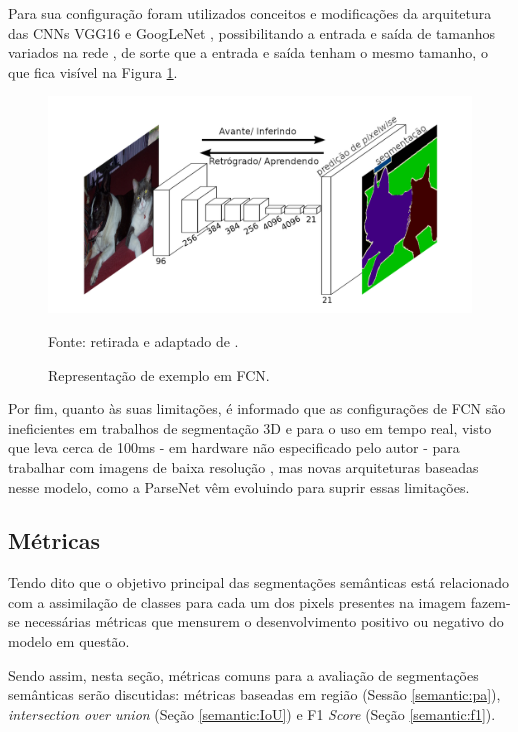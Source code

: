 Para sua configuração foram utilizados conceitos e modificações da arquitetura das CNNs VGG16 \cite{Simonyan2015} e GoogLeNet \cite{Szegedy2015}, possibilitando a entrada e saída de tamanhos variados na rede \cite{Minaee2021}, de sorte que a entrada e saída tenham o mesmo tamanho, o que fica visível na Figura \ref{semantic:fig:6}.

\begin{figure}[H]
    \centering
    \caption{Representação de exemplo em FCN.}
    \includegraphics[width=1\linewidth]{recursos/imagens/semantic/fcn_example.png}
    \label{semantic:fig:6}

    Fonte: retirada e adaptado de \cite{Shelhamer2016}.
\end{figure}

Por fim, quanto às suas limitações, é informado que as configurações de FCN são ineficientes em trabalhos de segmentação 3D e para o uso em tempo real, visto que leva cerca de 100ms - em hardware não especificado pelo autor - para trabalhar com imagens de baixa resolução \cite{Minaee2021}, mas novas arquiteturas baseadas nesse modelo, como a ParseNet \cite{Liu2015} vêm evoluindo para suprir essas limitações.


\subsection{Métricas}
\label{semantic:metrics}
Tendo dito que o objetivo principal das segmentações semânticas está relacionado com a assimilação de classes para cada um dos pixels presentes na imagem \cite{Csurka} fazem-se necessárias métricas que mensurem o desenvolvimento positivo ou negativo do modelo em questão.

Sendo assim, nesta seção, métricas comuns para a avaliação de segmentações semânticas serão discutidas: métricas baseadas em região (Sessão \ref{semantic:pa}), \textit{intersection over union} (Seção \ref{semantic:IoU}) e F1 \textit{Score} (Seção \ref{semantic:f1}).



